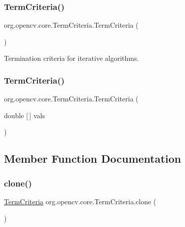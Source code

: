 \subsubsection{\texorpdfstring{Term\+Criteria()}{TermCriteria()}\hspace{0.1cm}{\footnotesize\ttfamily [2/3]}}
{\footnotesize\ttfamily org.\+opencv.\+core.\+Term\+Criteria.\+Term\+Criteria (\begin{DoxyParamCaption}{ }\end{DoxyParamCaption})}

Termination criteria for iterative algorithms. \mbox{\label{classorg_1_1opencv_1_1core_1_1_term_criteria_a5b2a060465f7c9bb947d830cabb5c025}} 
\subsubsection{\texorpdfstring{Term\+Criteria()}{TermCriteria()}\hspace{0.1cm}{\footnotesize\ttfamily [3/3]}}
{\footnotesize\ttfamily org.\+opencv.\+core.\+Term\+Criteria.\+Term\+Criteria (\begin{DoxyParamCaption}\item[{double \mbox{[}$\,$\mbox{]}}]{vals }\end{DoxyParamCaption})}



\subsection{Member Function Documentation}
\mbox{\label{classorg_1_1opencv_1_1core_1_1_term_criteria_ae5b02a1631cb0f906979161c4482c94f}} 
\subsubsection{\texorpdfstring{clone()}{clone()}}
{\footnotesize\ttfamily \mbox{\hyperlink{classorg_1_1opencv_1_1core_1_1_term_criteria}{Term\+Criteria}} org.\+opencv.\+core.\+Term\+Criteria.\+clone (\begin{DoxyParamCaption}{ }\end{DoxyParamCaption})}

